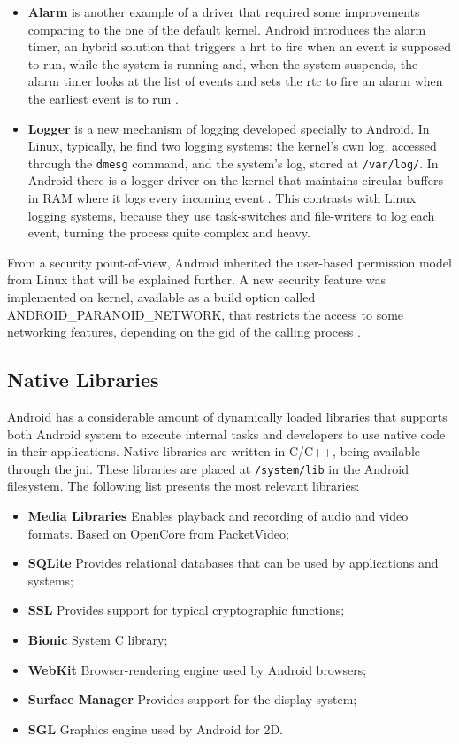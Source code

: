 \begin{itemize}
\item \textbf{Alarm} is another example of a driver that required some improvements comparing to the one of the default kernel. Android introduces the alarm timer, an hybrid solution that triggers a \gls{hrt} to fire when an event is supposed to run, while the system is running and, when the system suspends, the alarm timer looks at the list of events  and sets the \gls{rtc} to fire an alarm when the earliest event is to run \cite{AlarmTimer}.

\item \textbf{Logger} is a new mechanism of logging developed specially to Android. In Linux, typically, he find two logging systems: the kernel's own log, accessed through the \texttt{dmesg} command, and the system's log, stored at \texttt{/var/log/}. In Android there is a logger driver on the kernel that maintains circular buffers in RAM where it logs every incoming event \cite{Logger:eLinux}. This contrasts with Linux logging systems, because they use task-switches and file-writers to log each event, turning the process quite complex and heavy.

\end{itemize}

From a security point-of-view, Android inherited the user-based permission model from Linux that will be explained further. A new security feature was implemented on kernel, available as a build option called ANDROID\_PARANOID\_NETWORK, that restricts the access to some networking features, depending on the \gls{gid} of the calling process \cite{AndroidSecurity:AttackAndDefense}.


\subsection{Native Libraries}

Android has a considerable amount of dynamically loaded libraries that supports both Android system to execute internal tasks and  developers to use native code in their applications. Native libraries are written in C/C++, being available through the \gls{jni}. These libraries are placed at \texttt{/system/lib} in the Android filesystem. The following list presents the most relevant libraries:

\begin{itemize}
\item \textbf{Media Libraries} Enables playback and recording of audio and video formats. Based on OpenCore from PacketVideo;
\item \textbf{SQLite} Provides relational databases that can be used by applications and systems;
\item \textbf{SSL} Provides support for typical cryptographic functions;
\item \textbf{Bionic} System C library;
\item \textbf{WebKit} Browser-rendering engine used by Android browsers;
\item \textbf{Surface Manager} Provides support for the display system;
\item \textbf{SGL} Graphics engine used by Android for 2D.
\end{itemize}

